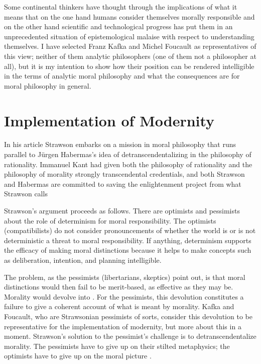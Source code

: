 \documentclass[11pt]{article}
\begin{document}
Some continental thinkers have thought through the implications of
what it means that on the one hand humans consider themselves morally
responsible and on the other hand scientific and technological
progress has put them in an unprecedented situation of epistemological
malaise with respect to understanding themselves. I have selected
Franz Kafka and Michel Foucault as representatives of this view;
neither of them analytic philosophers (one of them not a philosopher
at all), but it is my intention to show how their position can be
rendered intelligible in the terms of analytic moral philosophy and
what the consequences are for moral philosophy in general. 

\section{Implementation of Modernity}
\label{section:implementation}

In his article  Strawson embarks on a
mission in moral philosophy that runs parallel to J{\"u}rgen
Habermas's idea of detranscendentalizing in the philosophy of
rationality. Immanuel Kant had given both the philosophy of
rationality and the philosophy of morality strongly transcendental
credentials, and both Strawson and Habermas are committed to saving
the enlightenment project from what Strawson calls

Strawson's argument proceeds as follows. There are optimists and
pessimists about the role of determinism for moral responsibility. The
optimists (compatibilists) do not consider pronouncements of whether
the world is or is not deterministic a threat to moral responsibility.
If anything, determinism supports the efficacy of making moral
distinctions because it helps to make concepts such as deliberation,
intention, and planning intelligible.

The problem, as the pessimists (libertarians, skeptics) point out,
is that moral distinctions would then fail to be merit-based, as
effective as they may be. Morality would devolve into
. For the pessimists, this devolution
constitutes a failure to give a coherent account of what is meant by
morality. Kafka and Foucault, who are Strawsonian pessimists of sorts,
consider this devolution to be representative for the implementation
of modernity, but more about this in a moment. Strawson's solution to
the pessimist's challenge is to detranscendentalize morality. The
pessimists have to give up on their stilted metaphysics; the optimists
have to give up on the moral picture 
.
\end{document}
